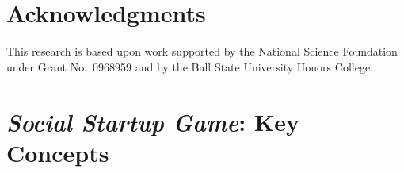 \documentclass[letterpaper]{article}
\begin{document}
\section{Acknowledgments}

This research is based upon work supported by the National Science
Foundation under Grant No.~0968959 and by the Ball State University
Honors College.





\clearpage
\appendix

\clearpage
\section{\textit{Social Startup Game}: Key Concepts}
\label{appendix:key-concepts}
\end{document}
